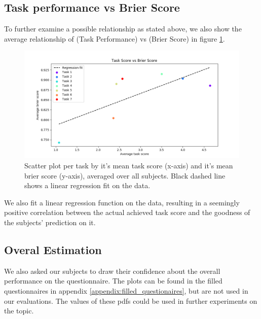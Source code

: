 \documentclass[../main/main.tex]{subfiles}
\begin{document}
\subsection{Task performance vs Brier Score}
To further examine a possible relationship as stated above, we also show the average relationship of (Task Performance) vs (Brier Score) in figure \ref{fig:brier_vs_rating}.
\begin{figure}[h]
	\centering
	\captionsetup{justification=centering}
	\includegraphics[width=\textwidth]{../assets/brier_vs_rating.png}
	\caption{Scatter plot per task by it's mean task score (x-axis) and it's mean brier score (y-axis), averaged over all subjects. Black dashed line shows a linear regression fit on the data.}
	\label{fig:brier_vs_rating} 
\end{figure}
We also fit a linear regression function on the data, resulting in a seemingly positive correlation between the actual achieved task score and the goodness of the subjects' prediction on it.
\subsection{Overal Estimation}
We also asked our subjects to draw their confidence about the overall performance on the questionnaire. The plots can be found in the filled questionnaires in appendix \ref{appendix:filled_questionaires}, but are not used in our evaluations. The values of these pdfs could be used in further experiments on the topic.
\end{document}
